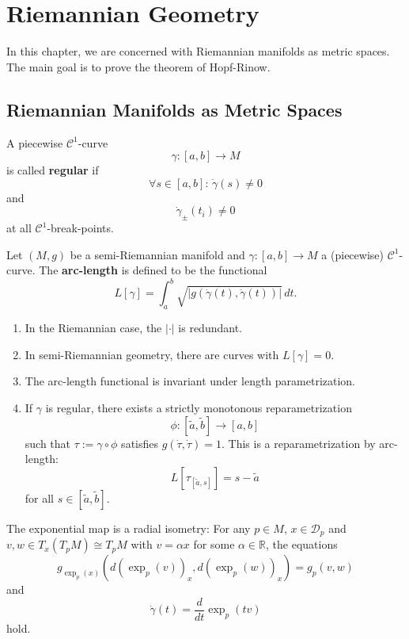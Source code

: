 \chapter{Riemannian Geometry}
In this chapter, we are concerned with Riemannian manifolds as metric spaces. The main goal is to prove the theorem of Hopf-Rinow.
\section{Riemannian Manifolds as Metric Spaces}
\begin{definition}
   A piecewise $\mathcal{C}^1$-curve \[
       \gamma: [a,b] \to M
   \] is called \textbf{regular} if 
   \[
       \forall s \in [a,b]:\, \dot{\gamma}(s)\neq 0
   \] and \[
   \dot{\gamma}_{\pm}(t_i) \neq 0
   \] at all $\mathcal{C}^1$-break-points.
\end{definition} 
\begin{definition}
    Let $(M,g)$ be a semi-Riemannian manifold and $\gamma: [a,b]\to M$ a (piecewise) $\mathcal{C}^1$-curve. The \textbf{arc-length} is defined to be the functional
    \[
        L[\gamma] = \int_a^b \sqrt{| g(\dot{\gamma}(t), \dot{\gamma}(t))|} \, dt
    .\] 
\end{definition}
\begin{remark}
   \begin{enumerate}
      \item In the Riemannian case, the $| \cdot |$ is redundant.
        \item In semi-Riemannian geometry, there are curves with $L[\gamma]=0$.
        \item The arc-length functional is invariant under length parametrization.
        \item If $\gamma$ is regular, there exists a strictly monotonous reparametrization \[
            \phi: [\tilde{a}, \tilde{b}] \to [a,b] \] such that $\tau := \gamma \circ \phi$ satisfies $g(\dot{\tau}, \dot{\tau})=1$. This is a reparametrization by arc-length: \[
            L[\tau_{[\tilde{a},s]}]=s-\tilde{a}
        \] for all $s \in [\tilde{a}, \tilde{b}]$.
   \end{enumerate} 
\end{remark}

\begin{theorem}
   The exponential map is a radial isometry: For any $p \in M$, $x \in \mathcal{D}_p$ and $v,w \in T_x(T_pM) \cong T_pM$ with $v = \alpha x$ for some $\alpha \in \mathbb{R}$, the equations \[
       g_{\exp_p(x)}(d(\exp_p(v))_x, d(\exp_p(w))_x)=g_p(v,w)
   \]  and \[
   \dot{\gamma}(t)=\frac{d}{dt}\exp_p(tv)
   \] hold.
\end{theorem}

